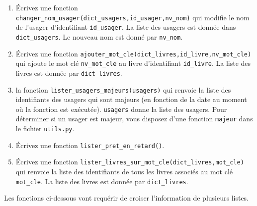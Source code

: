 \documentclass[10pt,a4paper]{sujets-exercices}
\begin{document}
\begin{enumerate}

\item Écrivez une fonction \texttt{changer\_nom\_usager(dict\_usagers,id\_usager,nv\_nom)} qui modifie le nom de l'usager d'identifiant \texttt{id\_usager}. La liste des usagers est donnée dans \texttt{dict\_usagers}. Le nouveau nom est donné par \texttt{nv\_nom}.

\item Écrivez une fonction \texttt{ajouter\_mot\_cle(dict\_livres,id\_livre,nv\_mot\_cle)} qui ajoute le mot clé \texttt{nv\_mot\_cle} au livre d'identifiant \texttt{id\_livre}. La liste des livres est donnée par \texttt{dict\_livres}.

\item la fonction \texttt{lister\_usagers\_majeurs(usagers)} qui renvoie la liste des identifiants des usagers qui sont majeurs (en fonction de la date au moment où la fonction est exécutée). \texttt{usagers} donne la liste des usagers. Pour déterminer si un usager est majeur, vous disposez d'une fonction \texttt{majeur} dans le fichier \texttt{utils.py}.

\item Écrivez une fonction \texttt{lister\_pret\_en\_retard()}.

\item Écrivez une fonction \texttt{lister\_livres\_sur\_mot\_cle(dict\_livres,mot\_cle)} qui renvoie la liste des identifiants de tous les livres associés au mot clé \texttt{mot\_cle}. La liste des livres est donnée par \texttt{dict\_livres}.

\end{enumerate}


Les fonctions ci-dessous vont requérir de croiser l'information de plusieurs listes.
\end{document}
